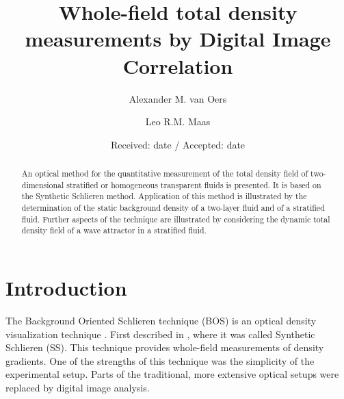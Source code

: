 \documentclass{svjour3}                     %
\begin{document}
\title{Whole-field total density measurements by Digital Image Correlation
}




\author{Alexander M. van Oers \and
       Leo R.M. Maas %
}



\date{Received: date / Accepted: date}


\maketitle

\begin{abstract}
An optical method for the quantitative measurement of the total density field of two-dimensional stratified or homogeneous transparent fluids is presented. It is based on the Synthetic Schlieren method. Application of this method is illustrated by the determination of the static background density of a two-layer fluid and of a stratified fluid. Further aspects of the technique are illustrated by considering the dynamic total density field of a wave attractor in a stratified fluid.
\end{abstract}

\section{Introduction}
\label{intro}
The Background Oriented Schlieren technique (BOS) is an optical density visualization technique \cite{meier2002computerized,raffel2015background}. First described in \cite{dalziel2000whole}, where it was called Synthetic Schlieren (SS). This technique provides whole-field measurements of density gradients. One of the strengths of this technique was the simplicity of the experimental setup. Parts of the traditional, more extensive optical setups were replaced by digital image analysis. 
\end{document}
